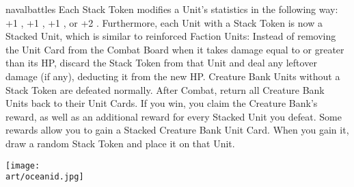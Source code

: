 \begin{multicols*}{2}
\begin{expansion}[before=\vspace*{-11mm}]{navalbattles}
  Each Stack Token modifies a Unit's statistics in the following way: +1 , +1 , +1 , or +2 .
  Furthermore, each Unit with a Stack Token is now a Stacked Unit, which is similar to reinforced Faction Units: Instead of removing the Unit Card from the Combat Board when it takes damage equal to or greater than its HP, discard the Stack Token from that Unit and deal any leftover damage (if any), deducting it from the new HP.
  Creature Bank Units without a Stack Token are defeated normally.
  After Combat, return all Creature Bank Units back to their Unit Cards.
  If you win, you claim the Creature Bank's reward, as well as an additional reward for every Stacked Unit you defeat.
  Some rewards allow you to gain a Stacked Creature Bank Unit Card.
  When you gain it, draw a random Stack Token and place it on that Unit.
\end{expansion}
\columnbreak

\texttt{[image: \\art/oceanid.jpg]}

\end{multicols*}

